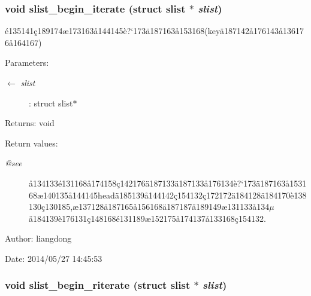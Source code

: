 \subsubsection{\setlength{\rightskip}{0pt plus 5cm}void slist\_\-begin\_\-iterate (struct slist $\ast$ {\em slist})}\label{slist_8c_a17}


\'{e}135141\c{c}189174\ae{}173163\aa{}144145\`{e}?`173\"{a}187163\aa{}153168(key\"{a}187142\aa{}176143\aa{}136176\aa{}164167) 

\begin{Desc}
\item[Parameters:]
\begin{description}
\item[\mbox{$\leftarrow$} {\em slist}]: struct slist$\ast$ \end{description}
\end{Desc}
\begin{Desc}
\item[Returns:]void \end{Desc}
\begin{Desc}
\item[Return values:]
\begin{description}
\item[{\em @see}]\aa{}134133\'{e}131168\aa{}174158\c{c}142176\"{a}187133\"{a}187133\aa{}176134\`{e}?`173\"{a}187163\aa{}153168\ae{}140135\aa{}144145head\"{a}185139\aa{}144142\c{c}154132\c{c}172172\"{a}184128\"{a}184170\`{e}138130\c{c}130185,\ae{}137128\"{a}187165\aa{}156168\"{a}187187\"{a}189149\ae{}131133\aa{}134$\mu$\"{a}184139\`{e}176131\c{c}148168\'{e}131189\ae{}152175\aa{}174137\aa{}133168\c{c}154132. \end{description}
\end{Desc}
\begin{Desc}
\item[Author:]liangdong \end{Desc}
\begin{Desc}
\item[Date:]2014/05/27 14:45:53 \end{Desc}
\subsubsection{\setlength{\rightskip}{0pt plus 5cm}void slist\_\-begin\_\-riterate (struct slist $\ast$ {\em slist})}\label{slist_8c_a20}


